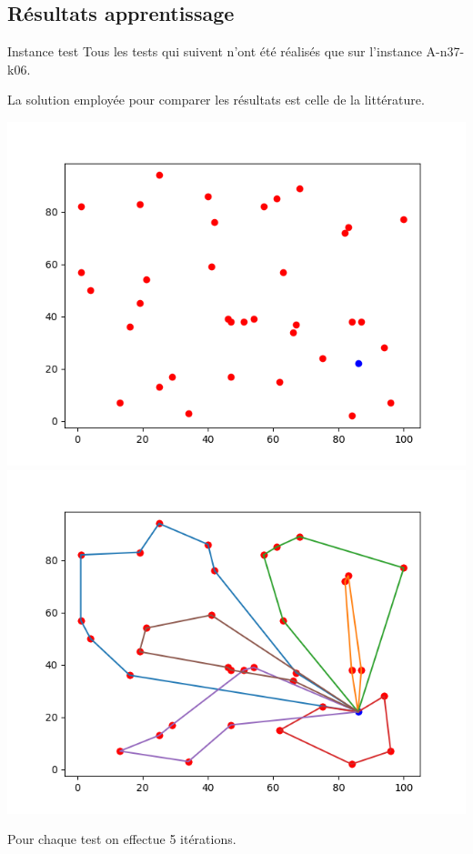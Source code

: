 \documentclass{beamer}
\begin{document}
\subsection{Résultats apprentissage}

\begin{frame}{Instance test}
Tous les tests qui suivent n'ont été réalisés que sur l'instance A-n37-k06.

La solution employée pour comparer les résultats est celle de la littérature.

\includegraphics[scale=0.3]{instance3706.png}
\includegraphics[scale=0.3]{best3706.png}

Pour chaque test on effectue 5 itérations.
\end{frame}
\end{document}
